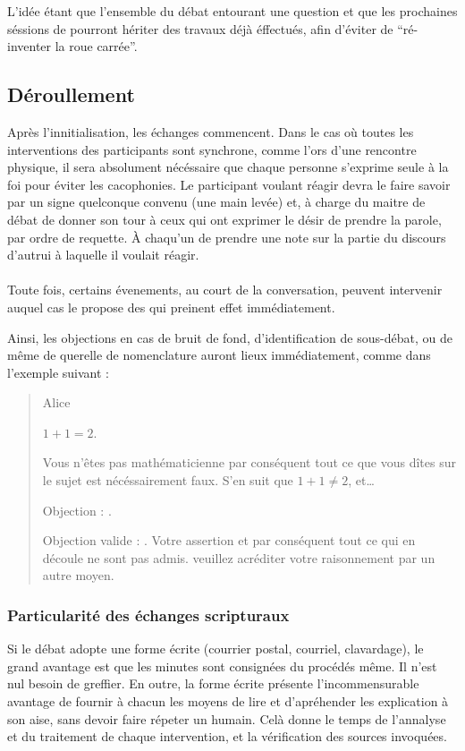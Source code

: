 L’idée étant que l’ensemble du débat entourant une question et que les prochaines séssions de \mainabbr{} pourront hériter des travaux déjà éffectués, afin d’éviter de \enquote{ré-inventer la roue carrée}.
\subsection{Déroullement}
Après l’innitialisation, les échanges commencent. Dans le cas où toutes les interventions des participants sont synchrone, comme l’ors d’une rencontre physique, il sera absolument nécéssaire que chaque personne s’exprime seule à la foi pour éviter les cacophonies. Le participant voulant réagir devra le faire savoir par un signe quelconque convenu (une main levée) et, à charge du maitre de débat de donner son tour à ceux qui ont exprimer le désir de prendre la parole, par ordre de requette. À chaqu’un de prendre une note sur la partie du discours d’autrui à laquelle il voulait réagir.

\paragraph{}
Toute fois, certains évenements, au court de la conversation, peuvent intervenir auquel cas le \mainabbr{} propose des  qui preinent effet immédiatement.

Ainsi, les objections en cas de bruit de fond, d’identification de sous-débat, ou de même de querelle de nomenclature auront lieux immédiatement, comme dans l’exemple suivant :
\begin{quote}
  \begin{drama}{0cm}{0cm}{Alice}

    \Aspeaks       $1+1=2$.

    \Bspeaks       Vous n’êtes pas mathématicienne par conséquent tout ce que vous dîtes sur le sujet est nécéssairement faux. S’en suit que $1+1\neq2$, et…

    \Aspeaks       Objection : .

    \Arbitrespeaks Objection valide : \B. Votre assertion et par conséquent tout ce qui en découle ne sont pas admis. veuillez acréditer votre raisonnement par un autre moyen.

  \end{drama}
\end{quote}

\subsubsection{Particularité des échanges scripturaux}
Si le débat adopte une forme écrite (courrier postal, courriel, clavardage), le grand avantage est que les minutes sont consignées du procédés même. Il n’est nul besoin de greffier. En outre, la forme écrite présente l’incommensurable avantage de fournir à chacun les moyens de lire et d’apréhender les explication à son aise, sans devoir faire répeter un humain. Celà donne le temps de l’annalyse et du traitement de chaque intervention, et la vérification des sources invoquées.

